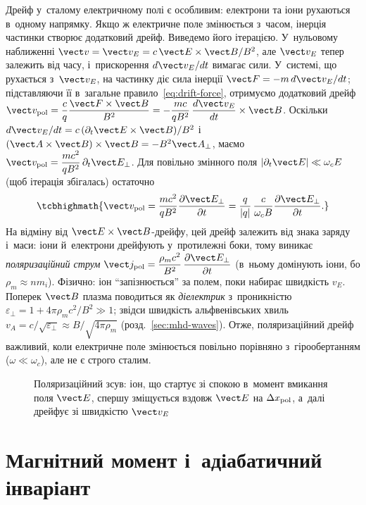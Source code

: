 Дрейф у~сталому електричному полі є особливим: електрони та іони рухаються в~одному
напрямку. Якщо ж електричне поле змінюється з~часом, інерція частинки створює додатковий
дрейф. Виведемо його ітерацією. У~нульовому наближенні $\vect v=\vect v_E=c\,\vect E\times\vect B/B^2$, але
$\vect v_E$ тепер залежить від часу, і~прискорення $d\vect v_E/dt$ вимагає сили. У~системі, що рухається
з~$\vect v_E$, на частинку діє сила інерції $\vect F=-m\,d\vect v_E/dt$; підставляючи її в~загальне
правило~\eqref{eq:drift-force}, отримуємо додатковий дрейф
$\vect v_{\rm pol}=\dfrac cq\dfrac{\vect F\times\vect B}{B^2}=-\dfrac{mc}{qB^2}\,\dfrac{d\vect v_E}{dt}\times\vect B$.
Оскільки $d\vect v_E/dt=c\,(\partial_t\vect E\times\vect B)/B^2$ і~$(\vect A\times\vect B)\times\vect B=-B^2\vect A_\perp$, маємо
$\vect v_{\rm pol}=\dfrac{mc^2}{qB^2}\,\partial_t\vect E_\perp$. Для повільно змінного поля $|\partial_t\vect E|\ll\omega_c E$ (щоб ітерація збігалась)
остаточно
\begin{equation}\label{eq:polarization-drift}
 \tcbhighmath{
 \vect v_{\mathrm{pol}}
 =\frac{mc^2}{qB^2}\frac{\partial\vect E_\perp}{\partial t}
 =\frac{q}{|q|}\,\frac{c}{\omega_c B}\frac{\partial\vect E_\perp}{\partial t}.
 }
\end{equation}
На відміну від $\vect E\times\vect B$-дрейфу, цей дрейф залежить від знака заряду і~маси: іони й~електрони
дрейфують у~протилежні боки, тому виникає \emph{поляризаційний струм}
$\vect j_{\mathrm{pol}}=\dfrac{\rho_mc^2}{B^2}\,\dfrac{\partial\vect E_\perp}{\partial t}$
(в~ньому домінують іони, бо $\rho_m\approx n m_i$). Фізично: іон \enquote{запізнюється} за полем, поки набирає швидкість $v_E$.
Поперек $\vect B$ плазма поводиться як \emph{діелектрик} з~проникністю $\varepsilon_\perp=1+4\pi\rho_mc^2/B^2\gg1$; звідси швидкість
альфвенівських хвиль $v_A=c/\sqrt{\varepsilon_\perp}\approx B/\sqrt{4\pi\rho_m}$ (розд.~\ref{sec:mhd-waves}).
Отже, поляризаційний дрейф важливий, коли електричне поле змінюється повільно порівняно
з~гірообертанням ($\omega\ll\omega_c$), але не є строго сталим.

\begin{figure}[ht]\centering
	\caption{Поляризаційний зсув: іон, що стартує зі спокою в~момент вмикання поля $\vect E$, спершу зміщується вздовж $\vect E$ на $\Delta x_{\rm pol}$, а~далі дрейфує зі швидкістю $\vect v_E$}
	\label{fig:polarization}
\end{figure}

\section{Магнітний момент і~адіабатичний інваріант}

